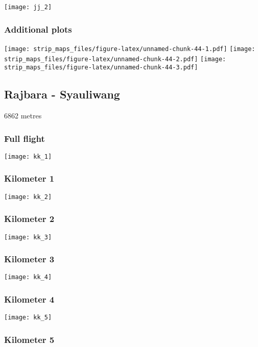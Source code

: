 \documentclass[]{article}
\begin{document}
\texttt{[image: jj\_2]}

\subsubsection{Additional plots}\label{additional-plots-35}

\texttt{[image: strip\_maps\_files/figure-latex/unnamed-chunk-44-1.pdf]}
\texttt{[image: strip\_maps\_files/figure-latex/unnamed-chunk-44-2.pdf]}
\texttt{[image: strip\_maps\_files/figure-latex/unnamed-chunk-44-3.pdf]}

\newpage

\subsection{Rajbara - Syauliwang}\label{rajbara---syauliwang}

6862 metres

\subsubsection{Full flight}\label{full-flight-36}

\texttt{[image: kk\_1]}

\subsubsection{Kilometer 1}\label{kilometer-1-36}

\texttt{[image: kk\_2]}

\subsubsection{Kilometer 2}\label{kilometer-2-36}

\texttt{[image: kk\_3]}

\subsubsection{Kilometer 3}\label{kilometer-3-36}

\texttt{[image: kk\_4]}

\subsubsection{Kilometer 4}\label{kilometer-4-35}

\texttt{[image: kk\_5]}

\subsubsection{Kilometer 5}\label{kilometer-5-29}
\end{document}
